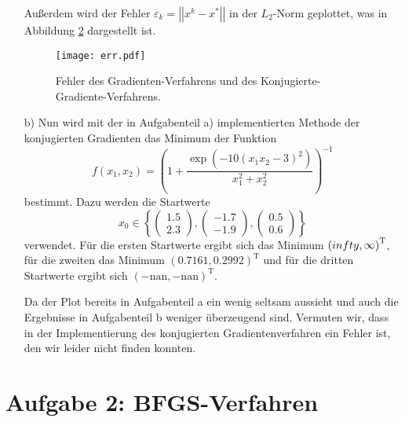 \begin{itemize}[leftmargin=*]
\begin{figure}[H]
              \label{fig:a1_2}
          \end{figure}
          \FloatBarrier
          \noindent
          Außerdem wird der Fehler $\varepsilon_k = \left| \left|x^k - x^{*} \right| \right|$ in der $L_2$-Norm
          geplottet, was in Abbildung \ref{fig:a1_3} dargestellt ist.
          \FloatBarrier
          \begin{figure}[H]
              \centering
              \texttt{[image: err.pdf]}
              \caption{Fehler des Gradienten-Verfahrens und des Konjugierte-Gradiente-Verfahrens.}
              \label{fig:a1_3}
          \end{figure}
          \FloatBarrier
          \noindent
\item[b)] Nun wird mit der in Aufgabenteil a) implementierten Methode der konjugierten Gradienten das Minimum
          der Funktion
          \begin{equation*}
            f\left(x_1, x_2\right) = \left(1 + \frac{\exp \left(-10 \left(x_1 x_2 -3\right)^2\right)}{x_1^2 + x_2^2}\right)^{-1}
          \end{equation*}
          bestimmt. Dazu werden die Startwerte
          \begin{equation*}
            x_0 \in \left\{\begin{pmatrix}
              1.5 \\
              2.3
            \end{pmatrix}, \begin{pmatrix}
              -1.7 \\
              -1.9
            \end{pmatrix}, \begin{pmatrix}
              0.5 \\
              0.6
            \end{pmatrix} \right\}
          \end{equation*}
          verwendet. Für die ersten Startwerte ergibt sich das Minimum $\left(\-infty, \infty \right)^{\text{T}}$, für die zweiten das Minimum $\left(0.7161, 0.2992\right)^{\text{T}}$ und für die dritten Startwerte ergibt sich
          $\left(-\text{nan},-\text{nan}\right)^{\text{T}}$.

        Da der Plot bereits in Aufgabenteil a ein wenig seltsam aussieht und auch die Ergebnisse in Aufgabenteil b weniger überzeugend sind. Vermuten wir, dass in der Implementierung des konjugierten Gradientenverfahren ein Fehler ist, den wir leider nicht finden konnten.
\end{itemize}

\section*{Aufgabe 2: BFGS-Verfahren}


